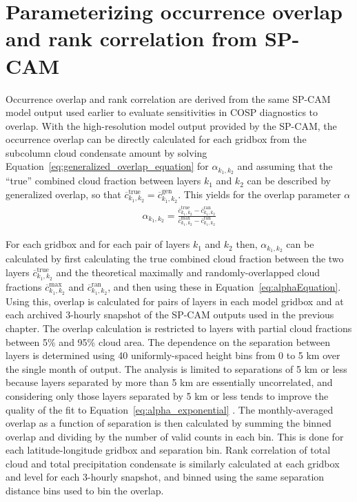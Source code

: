 \section{Parameterizing occurrence overlap and rank correlation from
SP-CAM}\label{sec:subgrid2Overlap}

Occurrence overlap and rank correlation are derived from the same SP-CAM
model output used earlier to evaluate sensitivities in COSP diagnostics
to overlap. With the high-resolution model output provided by the
SP-CAM, the occurrence overlap can be directly calculated for each
gridbox from the subcolumn cloud condensate amount by solving
Equation~\ref{eq:generalized_overlap_equation} for \(\alpha_{k_1, k_2}\)
and assuming that the ``true'' combined cloud fraction between layers
\(k_1\) and \(k_2\) can be described by generalized overlap, so that
\(\overline{c}^\textrm{true}_{k_1, k_2} = \overline{c}^\textrm{gen}_{k_1, k_2}\).
This yields for the overlap parameter \(\alpha\)
\begin{equation}\begin{gathered} 
    \alpha_{k_1, k_2} = \frac{
        \overline{c}^\textrm{true}_{k_1, k_2} 
            - \overline{c}^\textrm{ran}_{k_1, k_2} 
    }{
        \overline{c}^\textrm{max}_{k_1, k_2} 
            - \overline{c}^\textrm{ran}_{k_1, k_2} 
    }
\end{gathered}\label{eq:alphaEquation}\end{equation}

For each gridbox and for each pair of layers \(k_1\) and \(k_2\) then,
\(\alpha_{k_1, k_2}\) can be calculated by first calculating the true
combined cloud fraction between the two layers
\(\overline{c}^\textrm{true}_{k_1, k_2}\) and the theoretical maximally
and randomly-overlapped cloud fractions
\(\overline{c}^\textrm{max}_{k_1, k_2}\) and
\(\overline{c}^\textrm{ran}_{k_1, k_2}\), and then using these in
Equation~\ref{eq:alphaEquation}. Using this, overlap is calculated for
pairs of layers in each model gridbox and at each archived 3-hourly
snapshot of the SP-CAM outputs used in the previous chapter. The overlap
calculation is restricted to layers with partial cloud fractions between
5\% and 95\% cloud area. The dependence on the separation between layers
is determined using 40 uniformly-spaced height bins from 0 to 5 km over
the single month of output. The analysis is limited to separations of 5
km or less because layers separated by more than 5 km are essentially
uncorrelated, and considering only those layers separated by 5 km or
less tends to improve the quality of the fit to
Equation~\ref{eq:alpha_exponential} \citep{pincus_et_al_2005}. The
monthly-averaged overlap as a function of separation is then calculated
by summing the binned overlap and dividing by the number of valid counts
in each bin. This is done for each latitude-longitude gridbox and
separation bin. Rank correlation of total cloud and total precipitation
condensate is similarly calculated at each gridbox and level for each
3-hourly snapshot, and binned using the same separation distance bins
used to bin the overlap.


